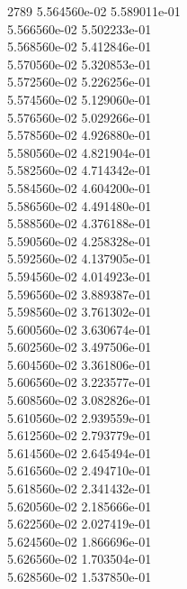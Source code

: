 2789	5.564560e-02	5.589011e-01	\\ 	5.566560e-02	5.502233e-01	\\ 	5.568560e-02	5.412846e-01	\\ 	5.570560e-02	5.320853e-01	\\ 	5.572560e-02	5.226256e-01	\\ 	5.574560e-02	5.129060e-01	\\ 	5.576560e-02	5.029266e-01	\\ 	5.578560e-02	4.926880e-01	\\ 	5.580560e-02	4.821904e-01	\\ 	5.582560e-02	4.714342e-01	\\ 	5.584560e-02	4.604200e-01	\\ 	5.586560e-02	4.491480e-01	\\ 	5.588560e-02	4.376188e-01	\\ 	5.590560e-02	4.258328e-01	\\ 	5.592560e-02	4.137905e-01	\\ 	5.594560e-02	4.014923e-01	\\ 	5.596560e-02	3.889387e-01	\\ 	5.598560e-02	3.761302e-01	\\ 	5.600560e-02	3.630674e-01	\\ 	5.602560e-02	3.497506e-01	\\ 	5.604560e-02	3.361806e-01	\\ 	5.606560e-02	3.223577e-01	\\ 	5.608560e-02	3.082826e-01	\\ 	5.610560e-02	2.939559e-01	\\ 	5.612560e-02	2.793779e-01	\\ 	5.614560e-02	2.645494e-01	\\ 	5.616560e-02	2.494710e-01	\\ 	5.618560e-02	2.341432e-01	\\ 	5.620560e-02	2.185666e-01	\\ 	5.622560e-02	2.027419e-01	\\ 	5.624560e-02	1.866696e-01	\\ 	5.626560e-02	1.703504e-01	\\ 	5.628560e-02	1.537850e-01	\\ \hline
